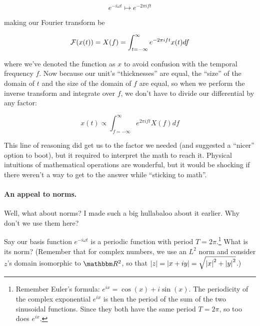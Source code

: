\documentclass[letterpaper,12pt]{report}
\begin{document}
\[e^{-i\omega t} \mapsto e^{-2\pi ift} \]

making our Fourier transform be

\[\mathcal{F}(x(t)) = X(f) 
  = \int_{t=-\infty}^{\infty} e^{-2\pi ift} x(t) df\]

where we've denoted the function as \(x\)
to avoid confusion with the temporal frequency \(f\).
Now because our unit's ``thicknesses'' are equal,
the ``size'' of the domain of \(t\) and the size of the
domain of \(f\) are equal, so when we perform the
inverse transform and integrate over \(f\), we don't
have to divide our differential by any factor:

\[x(t) \propto 
  \int_{f=-\infty}^{\infty} e^{2\pi ift} X(f) df \]

This line of reasoning did get us to the factor we needed
(and suggested a ``nicer'' option to boot), but it required
to interpret the math to reach it. Physical intuitions
of mathematical operations are wonderful, but it would
be shocking if there weren't a way to get to the answer
while ``sticking to math''.


\paragraph{An appeal to norms.}

Well, what about norms? I made such a big hullabaloo about
it earlier. Why don't we use them here? \par

Say our basis function \(e^{-i\omega t}\) is a periodic function
with period \(T = 2\pi\).\footnote
{
  Remember Euler's formula: \(e^{ix} = \cos(x) + i\sin(x)\).
  The periodicity of the complex exponential \(e^{ix}\) is then
  the period of the sum of the two sinusoidal functions.
  Since they both have the same period \(T = 2\pi\),
  so too does \(e^{ix}\).
} What is its norm? 
(Remember that for complex numbers, we use an 
\(L^2\) norm and consider \(z\)'s domain isomorphic to 
\(\domain{R}^2\), so that \(\left|z\right| = \left|x + iy\right|
= \sqrt{\left|x\right|^2 + \left|y\right|^2}\).)
\end{document}
